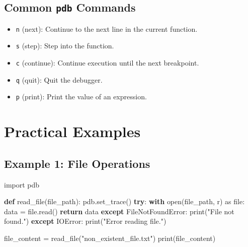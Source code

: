 \documentclass[
  letterpaper,
  DIV=11,
  numbers=noendperiod]{scrreprt}
\newenvironment{Shaded}{\begin{snugshade}}{\end{snugshade}}
\newcommand{\BuiltInTok}[1]{\textcolor[rgb]{0.00,0.23,0.31}{#1}}
\newcommand{\ControlFlowTok}[1]{\textcolor[rgb]{0.00,0.23,0.31}{\textbf{#1}}}
\newcommand{\ImportTok}[1]{\textcolor[rgb]{0.00,0.46,0.62}{#1}}
\newcommand{\KeywordTok}[1]{\textcolor[rgb]{0.00,0.23,0.31}{\textbf{#1}}}
\newcommand{\NormalTok}[1]{\textcolor[rgb]{0.00,0.23,0.31}{#1}}
\newcommand{\OperatorTok}[1]{\textcolor[rgb]{0.37,0.37,0.37}{#1}}
\newcommand{\PreprocessorTok}[1]{\textcolor[rgb]{0.68,0.00,0.00}{#1}}
\newcommand{\StringTok}[1]{\textcolor[rgb]{0.13,0.47,0.30}{#1}}
\providecommand{\tightlist}{%
  \setlength{\itemsep}{0pt}\setlength{\parskip}{0pt}}\usepackage{longtable,booktabs,array}
\begin{document}
\subsection{\texorpdfstring{Common \texttt{pdb}
Commands}{Common pdb Commands}}\label{common-pdb-commands}

\begin{itemize}
\tightlist
\item
  \texttt{n} (next): Continue to the next line in the current function.
\item
  \texttt{s} (step): Step into the function.
\item
  \texttt{c} (continue): Continue execution until the next breakpoint.
\item
  \texttt{q} (quit): Quit the debugger.
\item
  \texttt{p} (print): Print the value of an expression.
\end{itemize}

\section{Practical Examples}\label{practical-examples}

\subsection{Example 1: File Operations}\label{example-1-file-operations}

\begin{Shaded}
\begin{Highlighting}[]
\ImportTok{import}\NormalTok{ pdb}

\KeywordTok{def}\NormalTok{ read\_file(file\_path):}
\NormalTok{    pdb.set\_trace()}
    \ControlFlowTok{try}\NormalTok{:}
        \ControlFlowTok{with} \BuiltInTok{open}\NormalTok{(file\_path, }\StringTok{\textquotesingle{}r\textquotesingle{}}\NormalTok{) }\ImportTok{as} \BuiltInTok{file}\NormalTok{:}
\NormalTok{            data }\OperatorTok{=} \BuiltInTok{file}\NormalTok{.read()}
            \ControlFlowTok{return}\NormalTok{ data}
    \ControlFlowTok{except} \PreprocessorTok{FileNotFoundError}\NormalTok{:}
        \BuiltInTok{print}\NormalTok{(}\StringTok{"File not found."}\NormalTok{)}
    \ControlFlowTok{except} \PreprocessorTok{IOError}\NormalTok{:}
        \BuiltInTok{print}\NormalTok{(}\StringTok{"Error reading file."}\NormalTok{)}

\NormalTok{file\_content }\OperatorTok{=}\NormalTok{ read\_file(}\StringTok{"non\_existent\_file.txt"}\NormalTok{)}
\BuiltInTok{print}\NormalTok{(file\_content)}
\end{Highlighting}
\end{Shaded}
\end{document}
